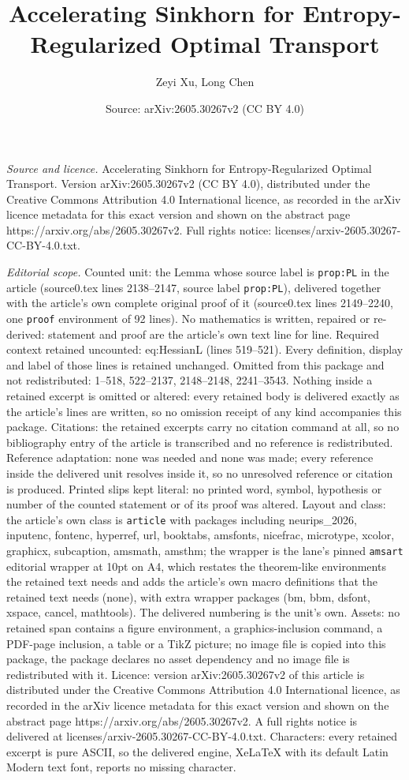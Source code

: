 \documentclass[10pt,a4paper]{amsart}
\title[Accelerating Sinkhorn for Entropy-Regularized Optimal Transp]{Accelerating Sinkhorn for Entropy-Regularized Optimal Transport}
\author{Zeyi Xu, Long Chen}
\date{Source: arXiv:2605.30267v2 (CC BY 4.0)}
\begin{document}
\maketitle

\noindent\emph{Source and licence.} Accelerating Sinkhorn for Entropy-Regularized Optimal Transport. Version arXiv:2605.30267v2 (CC BY 4.0), distributed under the Creative Commons Attribution 4.0 International licence, as recorded in the arXiv licence metadata for this exact version and shown on the abstract page https://arxiv.org/abs/2605.30267v2. Full rights notice: licenses/arxiv-2605.30267-CC-BY-4.0.txt.\par\smallskip

\noindent\textit{Editorial scope.} Counted unit: the Lemma whose source label is \texttt{prop:PL} in the article (source0.tex lines 2138--2147, source label \texttt{prop:PL}), delivered together with the article's own complete original proof of it (source0.tex lines 2149--2240, one \texttt{proof} environment of 92 lines). No mathematics is written, repaired or re-derived: statement and proof are the article's own text line for line. Required context retained uncounted: eq:HessianL (lines 519--521). Every definition, display and label of those lines is retained unchanged. Omitted from this package and not redistributed: 1--518, 522--2137, 2148--2148, 2241--3543. Nothing inside a retained excerpt is omitted or altered: every retained body is delivered exactly as the article's lines are written, so no omission receipt of any kind accompanies this package. Citations: the retained excerpts carry no citation command at all, so no bibliography entry of the article is transcribed and no reference is redistributed. Reference adaptation: none was needed and none was made; every reference inside the delivered unit resolves inside it, so no unresolved reference or citation is produced. Printed slips kept literal: no printed word, symbol, hypothesis or number of the counted statement or of its proof was altered. Layout and class: the article's own class is \texttt{article} with packages including neurips\_2026, inputenc, fontenc, hyperref, url, booktabs, amsfonts, nicefrac, microtype, xcolor, graphicx, subcaption, amsmath, amsthm; the wrapper is the lane's pinned \texttt{amsart} editorial wrapper at 10pt on A4, which restates the theorem-like environments the retained text needs and adds the article's own macro definitions that the retained text needs (none), with extra wrapper packages (bm, bbm, dsfont, xspace, cancel, mathtools). The delivered numbering is the unit's own. Assets: no retained span contains a figure environment, a graphics-inclusion command, a PDF-page inclusion, a table or a TikZ picture; no image file is copied into this package, the package declares no asset dependency and no image file is redistributed with it. Licence: version arXiv:2605.30267v2 of this article is distributed under the Creative Commons Attribution 4.0 International licence, as recorded in the arXiv licence metadata for this exact version and shown on the abstract page https://arxiv.org/abs/2605.30267v2. A full rights notice is delivered at licenses/arxiv-2605.30267-CC-BY-4.0.txt. Characters: every retained excerpt is pure ASCII, so the delivered engine, XeLaTeX with its default Latin Modern text font, reports no missing character.
\end{document}
